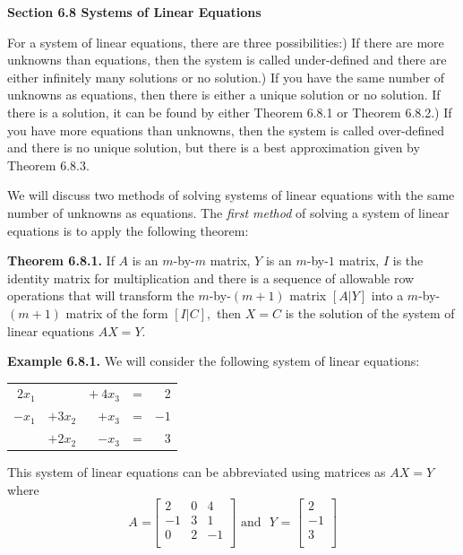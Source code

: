 \begin{large}
\textbf{Section 6.8 Systems of Linear Equations}\nl

For a system of linear equations, there are three possibilities:) If there are more unknowns than equations, then the system is called under-defined and there are either infinitely many solutions or no solution.) If you have the same number of unknowns as equations, then there is either a unique solution or no solution.  If there is a solution, it can be found by either Theorem 6.8.1 or Theorem 6.8.2.) If you have more equations than unknowns, then the system is called over-defined and there is no unique solution, but there is a best approximation given by Theorem 6.8.3.\nl

We will discuss two methods of solving systems of linear equations with the same number of unknowns as equations.  The \textit{first method} of solving a system of linear equations is to apply the following theorem:\nl

\textbf{Theorem 6.8.1.}  If $A$ is an $m$-by-$m$ matrix, $Y$ is an $m$-by-$1$ matrix, $I$ is the identity matrix for multiplication and there is a sequence of allowable row operations that will transform the $m$-by-$(m + 1)$ matrix $[A | Y]$ into a $m$-by-$(m + 1)$ matrix of the form $[I | C],$ then $X = C$ is the solution of the system of linear equations $AX = Y.$\nl

\textbf{Example 6.8.1.}  We will consider the following system of linear equations:\nl
\begin{tabular}{r r r c r}
$2x_{1}$&&$+~4x_{3}$&=& 2\\
$-x_{1}$&$+3x_{2}$&$+x_{3}$&=& $-1$\\
&$+2x_{2}$&$-x_{3}$&=& 3\\
\end{tabular}\nl

This system of linear equations can be abbreviated using matrices as $AX = Y$ where \nl
\begin{equation*}
\textit{A =}\left[
\begin{array}{rrr}
2 &0&4 \\
-1&3&1\\
0&2&-1\\
\end{array}
\right]
\text{~and~} \textit{~Y~=~}\left[
\begin{array}{rrr}
2 \\
-1\\
3\\
\end{array}
\right]
\end{equation*}\nl


\end{large}
